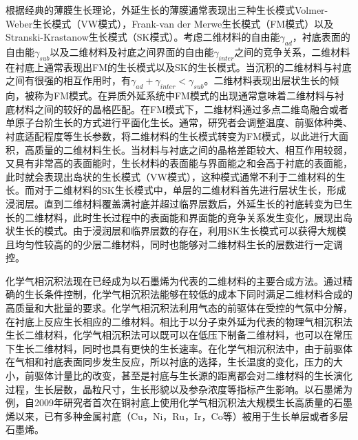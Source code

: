     根据经典的薄膜生长理论，外延生长的薄膜通常表现出三种生长模式\chinesecolon Volmer-Weber生长模式（VW模式），Frank-van der Merwe生长模式（FM模式）以及Stranski-Krastanow生长模式（SK模式）。考虑二维材料的自由能$\gamma_{ad}$，衬底表面的自由能$\gamma_{sub}$以及二维材料及衬底之间界面的自由能$\gamma_{inter}$之间的竞争关系，二维材料在衬底上通常表现出FM的生长模式以及SK的生长模式。当沉积的二维材料与衬底之间有很强的相互作用时，有$\gamma_{ad}+\gamma_{inter}<\gamma_{sub}$。二维材料表现出层状生长的倾向，被称为FM模式。在异质外延系统中FM模式的出现通常意味着二维材料与衬底材料之间的较好的晶格匹配。在FM模式下，二维材料通过多点二维岛融合或者单原子台阶生长的方式进行平面化生长。通常，研究者会调整温度、前驱体种类、衬底适配程度等生长参数，将二维材料的生长模式转变为FM模式，以此进行大面积，高质量的二维材料生长。当材料与衬底之间的晶格差距较大、相互作用较弱，又具有非常高的表面能时，生长材料的表面能与界面能之和会高于衬底的表面能，此时就会表现出岛状的生长模式（VW模式），这种模式通常不利于二维材料的生长。而对于二维材料的SK生长模式中，单层的二维材料首先进行层状生长，形成浸润层。直到二维材料覆盖满衬底并超过临界层数后，外延生长的衬底转变为已生长的二维材料，此时生长过程中的表面能和界面能的竞争关系发生变化，展现出岛状生长的模式。由于浸润层和临界层数的存在，利用SK生长模式可以获得大规模且均匀性较高的的少层二维材料，同时也能够对二维材料生长的层数进行一定调控。%

    化学气相沉积法现在已经成为以石墨烯为代表的二维材料的主要合成方法。通过精确的生长条件控制，化学气相沉积法能够在较低的成本下同时满足二维材料合成的高质量和大批量的要求。化学气相沉积法利用气态的前驱体在受控的气氛中分解，在衬底上反应生长相应的二维材料。相比于以分子束外延为代表的物理气相沉积法生长二维材料，化学气相沉积法可以既可以在低压下制备二维材料，也可以在常压下生长二维材料，同时也具有更快的生长速率。在化学气相沉积法中，由于前驱体在气相和衬底表面同步发生反应，所以衬底的选择，生长温度的变化，压力的大小，前驱体计量比的改变，甚至是衬底与生长源的距离都会对二维材料的生长演化过程，生长层数，晶粒尺寸，生长形貌以及参杂浓度等指标产生影响。以石墨烯为例，自2009年研究者首次在铜衬底上使用化学气相沉积法大规模生长高质量的石墨烯以来，已有多种金属衬底（Cu，Ni，Ru，Ir，Co等）被用于生长单层或者多层石墨烯。%

